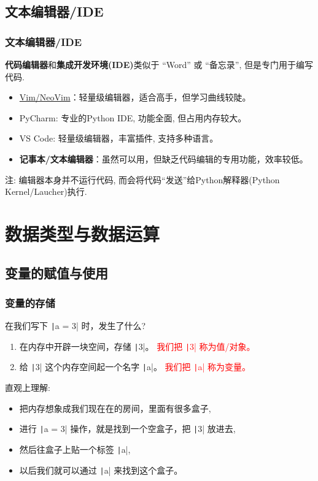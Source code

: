 \documentclass[handout]{ctexbeamer}
\begin{document}
        \subsection{文本编辑器/IDE}
        \begin{frame}
            \frametitle{文本编辑器/IDE}
            \textbf{代码编辑器}和\textbf{集成开发环境(IDE)}类似于 ``Word'' 或 ``备忘录'', 但是专门用于编写代码.
            \vspace{1em}
            \begin{itemize}
                \item \href{https://www.vim.org/download.php}{Vim/NeoVim}：轻量级编辑器，适合高手，但学习曲线较陡。
                \item PyCharm: 专业的Python IDE, 功能全面, 但占用内存较大。
                \item VS Code: 轻量级编辑器，丰富插件, 支持多种语言。
                \item \textbf{记事本/文本编辑器}：虽然可以用，但缺乏代码编辑的专用功能，效率较低。
            \end{itemize}
            \vspace{1em}\pause
            \begin{notice}
                注: 编辑器本身并不运行代码, 而会将代码``发送''给Python解释器(Python Kernel/Laucher)执行.
            \end{notice}
        \end{frame}

    \section{数据类型与数据运算}
    \subsection{变量的赋值与使用}
    \begin{frame}
        \frametitle{变量的存储}
        在我们写下 \texttt|a = 3| 时，发生了什么? \pause
        \begin{enumerate}
            \item 在内存中开辟一块空间，存储 \texttt|3|。 \textcolor{red}{我们把 \texttt|3| 称为值/对象。}
            \item 给 \texttt|3| 这个内存空间起一个名字 \texttt|a|。 \textcolor{red}{我们把 \texttt|a| 称为变量。}
        \end{enumerate}
        \pause\vspace{2em}
        直观上理解: 
        \begin{itemize}
            \item 把内存想象成我们现在在的房间，里面有很多盒子,
            \item 进行 \texttt|a = 3| 操作，就是找到一个空盒子，把 \texttt|3| 放进去,
            \item 然后往盒子上贴一个标签 \texttt|a|,
            \item 以后我们就可以通过 \texttt|a| 来找到这个盒子。
        \end{itemize}
    \end{frame}
\end{document}

